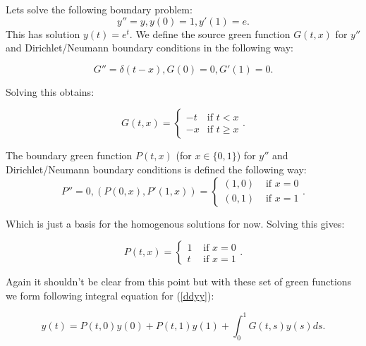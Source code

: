 \documentclass[a4paper,12pt]{article}
\begin{document}
\begin{example}[$y''=y$ mixed boundary conditions]
    Lets solve the following boundary problem:
    \begin{equation} \label{ddyy}
        y'' = y, y(0) = 1, y'(1)=e.
    \end{equation}
    This has solution $y(t) = e^{t}$. We define the source green function $G(t,x)$
    for $y''$ and Dirichlet/Neumann boundary conditions in the following way:

    \begin{equation}
        G''= \delta(t-x),G(0)=0,G'(1)=0.
    \end{equation}

    Solving this obtains:

    \begin{equation}
        G(t,x) =
        \begin{cases}
            -t & \text{if } t <  x   \\
            -x & \text{if } t \ge  x
        \end{cases}.
    \end{equation}

    The boundary green function $P(t,x)$ (for $x \in \{0,1\}$)
    for $y''$ and Dirichlet/Neumann boundary conditions is defined
    the following way:
    \begin{equation}
        P'' = 0, \left(P(0,x),P'(1,x) \right)=
        \begin{cases}
            (1 , 0) & \text{ if } x=0 \\
            (0 , 1) & \text{ if } x=1
        \end{cases}.
    \end{equation}

    Which is just a basis for the homogenous solutions for now. Solving
    this gives:

    \begin{equation}
        P(t,x) =
        \begin{cases}
            1 & \text{ if } x=0 \\
            t & \text{ if } x=1
        \end{cases}.
    \end{equation}

    Again it shouldn't be clear from this point but with these set of green
    functions we form following integral equation for (\ref{ddyy}):

    \begin{equation} \label{int ddyy}
        y(t) = P(t,0)y(0) + P(t,1)y(1) + \int_{0}^{1}G(t,s) y(s) ds.
    \end{equation}


\end{example}
\end{document}

